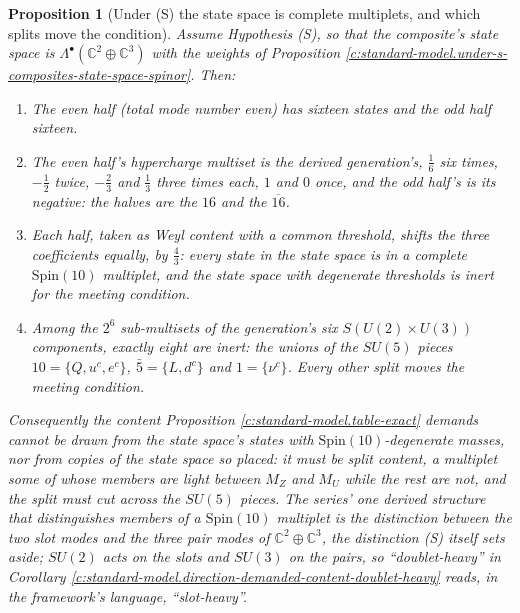 \documentclass[11pt]{article}
\newtheorem{proposition}[theorem]{Proposition}
\theoremstyle{definition}
\theoremstyle{plain}
\newcommand{\changedmark}[2]{\marginpar{\raggedright\scriptsize\color{#1}#2}}
\providecommand{\C}{}\renewcommand{\C}{\mathbb{C}}
\begin{document}
\begin{proposition}[Under (S) the state space is complete multiplets, and which splits move the condition]\label{c:standard-model.under-s-state-space-complete-multiplets}
\changedmark{gray}{reworded}
Assume Hypothesis (S), so that the composite's state space is $\Lambda^{\bullet}(\C^{2} \oplus \C^{3})$ with the weights of Proposition \ref{c:standard-model.under-s-composites-state-space-spinor}. Then:
\begin{enumerate}
\item[(1)] The even half (total mode number even) has sixteen states and the odd half sixteen.
\item[(2)] The even half's hypercharge multiset is the derived generation's, $\tfrac16$ six times, $-\tfrac12$ twice, $-\tfrac23$ and $\tfrac13$ three times each, $1$ and $0$ once, and the odd half's is its negative: the halves are the $16$ and the $\overline{16}$.
\item[(3)] Each half, taken as Weyl content with a common threshold, shifts the three coefficients equally, by $\tfrac43$: every state in the state space is in a complete $\mathrm{Spin}(10)$ multiplet, and the state space with degenerate thresholds is inert for the meeting condition.
\item[(4)] Among the $2^{6}$ sub-multisets of the generation's six $S(U(2) \times U(3))$ components, exactly eight are inert: the unions of the $SU(5)$ pieces $10 = \{Q, u^{c}, e^{c}\}$, $\bar{5} = \{L, d^{c}\}$ and $1 = \{\nu^{c}\}$. Every other split moves the meeting condition.
\end{enumerate}
Consequently the content Proposition \ref{c:standard-model.table-exact} demands cannot be drawn from the state space's states with $\mathrm{Spin}(10)$-degenerate masses, nor from copies of the state space so placed: it must be split content, a multiplet some of whose members are light between $M_{Z}$ and $M_{U}$ while the rest are not, and the split must cut across the $SU(5)$ pieces. The series' one derived structure that distinguishes members of a $\mathrm{Spin}(10)$ multiplet is the distinction between the two slot modes and the three pair modes of $\C^{2} \oplus \C^{3}$, the distinction (S) itself sets aside; $SU(2)$ acts on the slots and $SU(3)$ on the pairs, so ``doublet-heavy'' in Corollary \ref{c:standard-model.direction-demanded-content-doublet-heavy} reads, in the framework's language, ``slot-heavy''.
\end{proposition}
\end{document}
